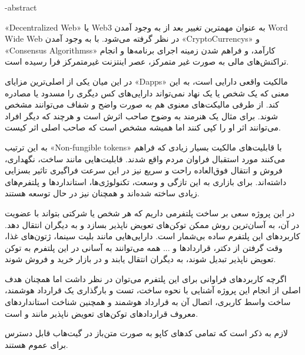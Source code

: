 



\fa-abstract{ %
«\gls{Decentralized Web}»
یا
Web3
 به عنوان مهمترین تغییر بعد از به وجود آمدن
\gls{Word Wide Web}
 در نظر گرفته می‌شود. با به وجود آمدن
«\glspl{CryptoCurrency}»
و
«\glspl{Consensus Algorithms}»
کارآمد، و فراهم شدن زمینه اجرای برنامه‌ها و انجام تراکنش‌های مالی به صورت غیر متمرکز، عصر اینتزنت غیرمتمرکز فرا رسیده است.

در این میان یکی از اصلی‌ترین مزایای 
«\glspl{Dapp}»
مالکیت واقعی دارایی است، به این معنی که یک شخص یا یک نهاد نمی‌تواند دارایی‌های کس دیگری را مسدود یا مصادره کند. از طرفی مالیکت‌های معنوی هم به صورت واضح و شفاف می‌توانند مشخص شوند. برای مثال یک هنرمند به وضوح صاحب اثرش است و هرچند که دیگر افراد می‌توانند اثر او را کپی کنند اما همیشه مشخص است که صاحب اصلی اثر کیست.

به این ترتیب 
«\glspl{Non-fungible token}»
 با قابلیت‌های مالکیت بسیار زیادی که فراهم می‌کنند مورد استقبال فراوان مردم واقع شدند. قابلیت‌هایی مانند ساخت، نگهداری، فروش و انتقال فوق‌العاده راحت و سریع نیز در این سرعت فراگیری تاثیر بسزایی داشته‌اند. برای بازاری به این تازگی و وسعت، تکنولوژی‌ها، استاندارد‌ها و پلتفرم‌های زیادی ساخته شده‌اند و همچنان نیز در حال توسعه هستند.

در این پروژه سعی بر ساخت پلتفرمی داریم که هر شخص یا شرکتی بتواند با عضویت در آن، به آسان‌ترین روش ممکن توکن‌های تعویض ناپذیر‌ بسازد و به دیگران انتقال دهد. کاربرد‌های این پلتفرم ساده بی‌شمار است. دارایی‌هایی مانند بلیت سینما، ژتون‌های غذا، وقت گرفتن از دکتر، قراردادها و ... همه می‌توانند به آسانی در این پلتفرم به توکن تعویض ناپذیر تبدیل شوند، به دیگران انتقال یابند و در بازار خرید و فروش شوند.

اگرچه کاربردهای فراوانی برای این پلتفرم می‌توان در نظر داشت اما همچنان هدف اصلی از انجام این پروژه آشنایی با نحوه ساخت، تست و بارگذاری یک قرارداد هوشمند، ساخت واسط کاربری، اتصال آن به قرارداد هوشمند و همچنین شناخت استاندارد‌های معروف قرارداد‌های توکن‌های تعویض ناپذیر مانند
و
 است.

لازم به ذکر است که تمامی کدهای کاپو به صورت متن‌باز در 
گیت‌هاب
قابل دسترس برای عموم هستند.
}
